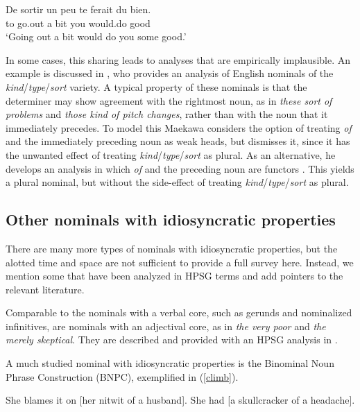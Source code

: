 \documentclass[output=paper
                ,modfonts
                ,nonflat
	        ,collection
	        ,collectionchapter
	        ,collectiontoclongg
 	        ,biblatex
                ,babelshorthands
                ,newtxmath
                ,draftmode
                ,colorlinks, citecolor=brown
]{./langsci/langscibook}
\begin{document}
\begin{exe} 
\ex\label{sorti}   
\gll   De sortir un peu te ferait du bien.  \\
       to go.out a bit you would.do {} good \\
\trans `Going out a bit would do you some good.'
\end{exe}  

\noindent
In some cases, this sharing leads to analyses that are empirically implausible. 
An example is discussed in \citet{Maekawa15}, who provides  
an analysis of English nominals of the \emph{kind}/\emph{type}/\emph{sort} variety.  
A typical property of these nominals is that the determiner may show agreement with the 
rightmost noun, as in \emph{these sort of problems} and \emph{those kind of pitch changes},
rather than with the noun that it immediately precedes. 
To model this Maekawa considers the option of treating \emph{of} and the immediately 
preceding noun as weak heads, but dismisses it, since it has the unwanted effect of treating 
\emph{kind}/\emph{type}/\emph{sort} as plural. 
As an alternative, he develops an analysis in which \emph{of} and 
the preceding noun are functors \citep[149]{Maekawa15}. This yields a plural nominal, but 
without the side-effect of treating \emph{kind}/\emph{type}/\emph{sort} as plural. 


\subsection{Other nominals with idiosyncratic properties} 
\label{other}


There are many more types of nominals with idiosyncratic properties,
but the alotted time and space are not sufficient to provide a full survey here. 
Instead, we mention some that have been analyzed in HPSG terms and add pointers 
to the relevant literature.    

Comparable to the nominals with a verbal core, such as gerunds and nominalized 
infinitives, are nominals with an adjectival core, as in \emph{the very poor} and 
\emph{the merely skeptical}. They are described and provided with an HPSG analysis 
in \citet{ArnoldSpencer2015}.

A much studied nominal with idiosyncratic properties is the Binominal Noun Phrase 
Construction (BNPC), exemplified in (\ref{climb}). 

\begin{exe}
\ex\label{climb}
\begin{xlist}
\ex  She blames it on [her nitwit of a husband]. 
\ex  She had [a skullcracker of a headache]. 
\end{xlist}
\end{exe}
\end{document}

